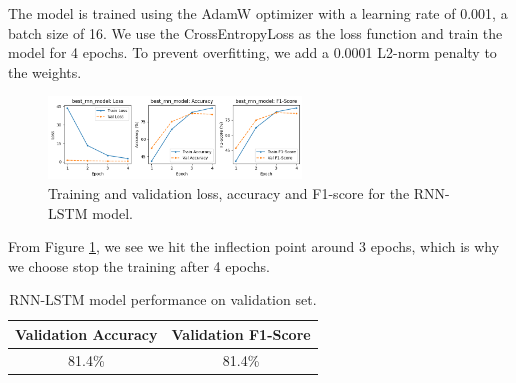 The model is trained using the AdamW optimizer with a learning rate of 0.001, a batch size of 16. We use the CrossEntropyLoss as the loss function and train the model for 4 epochs. To prevent overfitting, we add a 0.0001 L2-norm penalty to the weights.
\begin{figure}[H]
    \vspace*{0.7cm}
    \centering
    \includegraphics[width=0.6\textwidth]{figures/rnn_scores.png}
    \caption{Training and validation loss, accuracy and F1-score for the RNN-LSTM model.}
    \label{fig:rnn_scores}
    \vspace*{0.7cm}
\end{figure}
From Figure \ref{fig:rnn_scores}, we see we hit the inflection point around 3 epochs, which is why we choose stop the training after 4 epochs.
\begin{table}[H]
    \vspace*{-0.5cm}
    \centering
    \begin{tabular}{|c|c|}
    \hline
    Validation Accuracy & Validation F1-Score \\ \hline
    81.4\% & 81.4\% \\ \hline
    \end{tabular}
    \caption{RNN-LSTM model performance on validation set.}
    \label{tab:rnn_lstm_model}
    \vspace*{-0.8cm}
\end{table}
